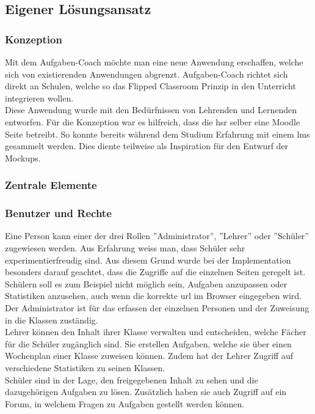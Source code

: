 \subsection{Eigener Lösungsansatz}
\subsubsection{Konzeption}
Mit dem Aufgaben-Coach möchte man eine neue Anwendung erschaffen, welche sich von existierenden Anwendungen abgrenzt. Aufgaben-Coach richtet sich direkt an Schulen, welche so das Flipped Classroom Prinzip in den Unterricht integrieren wollen. \\

Diese Anwendung wurde mit den Bedürfnissen von Lehrenden und Lernenden entworfen. Für die Konzeption war es hilfreich, dass die \gls{hsr} selber eine Moodle Seite betreibt. So konnte bereits während dem Studium Erfahrung mit einem \gls{lms} gesammelt werden. Dies diente teilweise als Inspiration für den Entwurf der Mockups.

\subsubsection{Zentrale Elemente}
\subsubsection*{Benutzer und Rechte}
Eine Person kann einer der drei Rollen ''Administrator'', ''Lehrer'' oder ''Schüler'' zugewiesen werden. Aus Erfahrung weiss man, dass Schüler sehr experimentierfreudig sind. Aus diesem Grund wurde bei der Implementation besonders darauf geachtet, dass die Zugriffe auf die einzelnen Seiten geregelt ist. Schülern soll es zum Beispiel nicht möglich sein, Aufgaben anzupassen oder Statistiken anzusehen, auch wenn die korrekte \gls{url} im Browser eingegeben wird. \\

Der Administrator ist für das erfassen der einzelnen Personen und der Zuweisung in die Klassen zuständig. \\

Lehrer können den Inhalt ihrer Klasse verwalten und entscheiden, welche Fächer für die Schüler zugänglich sind. Sie erstellen Aufgaben, welche sie über einen Wochenplan einer Klasse zuweisen können. Zudem hat der Lehrer Zugriff auf verschiedene Statistiken zu seinen Klassen. \\

Schüler sind in der Lage, den freigegebenen Inhalt zu sehen und die dazugehörigen Aufgaben zu lösen. Zusätzlich haben sie auch Zugriff auf ein Forum, in welchem Fragen zu Aufgaben gestellt werden können.

